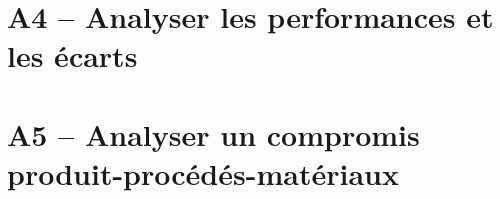 \section{A4 -- Analyser les performances et les écarts}

\section{A5 -- Analyser un compromis produit-procédés-matériaux}



\proffalse
\begin{multicols}{2}
%
%
%
%
%
%

\end{multicols}

%
%
%
%
%
%
